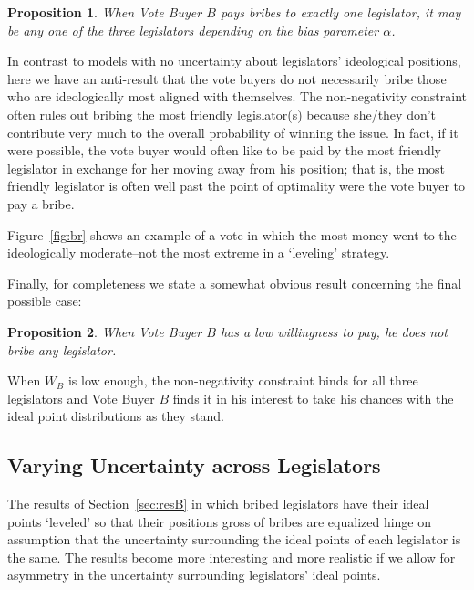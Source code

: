 \documentclass[12pt]{article}
\newtheorem{proposition}{Proposition}
\newcommand{\al}{\alpha}
\begin{document}
\begin{proposition}
  When Vote Buyer $B$ pays bribes to exactly one legislator, it may be any one of the three legislators depending on the bias parameter $\al$.
	\label{prop:1NNB}
\end{proposition}
In contrast to models with no uncertainty about legislators' ideological positions, here we have an anti-result that the vote buyers do not necessarily bribe those who are ideologically most aligned with themselves. The non-negativity constraint often rules out bribing the most friendly legislator(s) because she/they don't contribute very much to the overall probability of winning the issue. In fact, if it were possible, the vote buyer would often like to be paid by the most friendly legislator in exchange for her moving away from his position; that is, the most friendly legislator is often well past the point of optimality were the vote buyer to pay a bribe.

Figure~\ref{fig:br} shows an example of a vote in which the most money went to the ideologically moderate--not the most extreme in a `leveling' strategy.

Finally, for completeness we state a somewhat obvious result concerning the final possible case:

\begin{proposition}
  When Vote Buyer $B$ has a low willingness to pay, he does not bribe any legislator.
	\label{prop:0NNB}
\end{proposition}

When $W_B$ is low enough, the non-negativity constraint binds for all three legislators and Vote Buyer $B$ finds it in his interest to take his chances with the ideal point distributions as they stand.


\subsection{Varying Uncertainty across Legislators}
\label{sec:resunc}

The results of Section~\ref{sec:resB} in which bribed legislators have their ideal points `leveled' so that their positions gross of bribes are equalized hinge on assumption that the uncertainty surrounding the ideal points of each legislator is the same. The results become more interesting and more realistic if we allow for asymmetry in the uncertainty surrounding legislators' ideal points.
\end{document}
